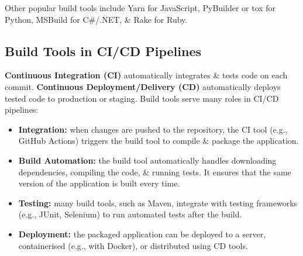 \documentclass[a4paper,11pt]{article}
\begin{document}
Other popular build tools include Yarn for JavaScript, PyBuilder or tox for Python, MSBuild for C\#/.NET, \& Rake for Ruby.

\subsection{Build Tools in CI/CD Pipelines}
\textbf{Continuous Integration (CI)} automatically integrates \& tests code on each commit.
\textbf{Continuous Deployment/Delivery (CD)} automatically deploys tested code to production or staging.
Build tools serve many roles in CI/CD pipelines:
\begin{itemize}
    \item   \textbf{Integration:} when changes are pushed to the repository, the CI tool (e.g., GitHub Actions) triggers the
            build tool to compile \& package the application.
    \item   \textbf{Build Automation:} the build tool automatically handles downloading dependencies, compiling the code, 
            \& running tests.
            It ensures that the same version of the application is built every time.
    \item   \textbf{Testing:} many build tools, such as Maven, integrate with testing frameworks (e.g., JUnit, Selenium) to
            run automated tests after the build.
    \item   \textbf{Deployment:} the packaged application can be deployed to a server, containerised (e.g., with Docker),
            or distributed using CD tools.
\end{itemize}
\end{document}
